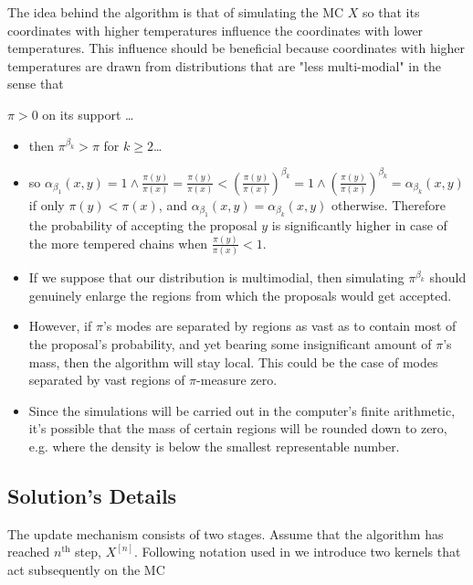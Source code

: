 The idea behind the algorithm is that of simulating the MC $X$ so that its coordinates with higher temperatures influence the coordinates with lower temperatures. This influence should be beneficial because coordinates with higher temperatures are drawn from distributions that are "less multi-modial" in the sense that

\begin{assumptions}[resume]
	\item $\pi > 0$ on its support \dots
\end{assumptions}
	

\begin{itemize}	
	\item then $\pi^{\beta_k} > \pi$ for $k \geq 2$\dots
	\item so $\alpha_{\beta_1}(x,y) = 1 \wedge \frac{\pi(y)}{\pi(x)} = \frac{\pi(y)}{\pi(x)} <  (\frac{\pi(y)}{\pi(x)})^{\beta_k} = 1 \wedge (\frac{\pi(y)}{\pi(x)})^{\beta_k} = \alpha_{\beta_k}(x,y)$ if only $\pi(y) < \pi(x)$, and $\alpha_{\beta_1}(x,y) = \alpha_{\beta_k}(x,y)$ otherwise. Therefore the probability of accepting the proposal $y$ is significantly higher in case of the more tempered chains when $\frac{\pi(y)}{\pi(x)} < 1$.
	\item If we suppose that our distribution is multimodial, then simulating $\pi^{\beta_k}$ should genuinely enlarge the regions from which the proposals would get accepted. 
	\item However, if $\pi$'s modes are separated by regions as vast as to contain most of the proposal's probability, and yet bearing some insignificant amount of $\pi$'s mass, then the algorithm will stay local. This could be the case of modes separated by vast regions of $\pi$-measure zero. 
	\item Since the simulations will be carried out in the computer's finite arithmetic, it's possible that the mass of certain regions will be rounded down to zero, e.g. where the density is below the smallest representable number.  
\end{itemize}  




	\subsection*{Solution's Details}

The update mechanism consists of two stages. Assume that the algorithm has reached $n^\text{th}$ step, $X^{[n]}$. Following notation used in \citet*{BłażejMiasojedow1} we introduce two kernels that act subsequently on the MC

